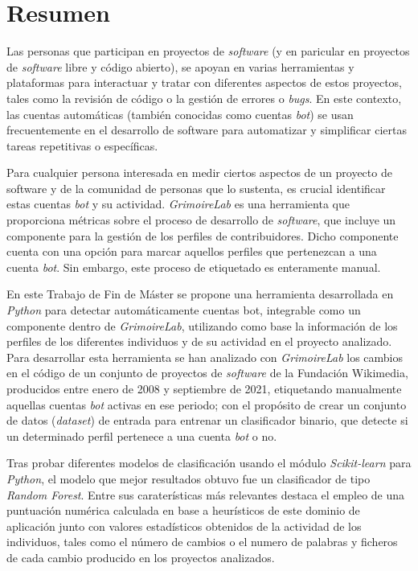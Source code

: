 \documentclass[a4paper, 12pt]{book}
\begin{document}

\chapter*{Resumen}

Las personas que participan en proyectos de \emph{software} (y en paricular en proyectos de \emph{software} libre y código abierto), se apoyan en varias herramientas y plataformas para interactuar y tratar con diferentes aspectos de estos proyectos, tales como la revisión de código o la gestión de errores o \emph{bugs}. En este contexto, las cuentas automáticas (también conocidas como cuentas \emph{bot}) se usan frecuentemente en el desarrollo de software para automatizar y simplificar ciertas tareas repetitivas o específicas.

Para cualquier persona interesada en medir ciertos aspectos de un proyecto de software y de la comunidad de personas que lo sustenta, es crucial identificar estas cuentas \emph{bot} y su actividad. \emph{GrimoireLab} es una herramienta que proporciona métricas sobre el proceso de desarrollo de \emph{software}, que incluye un componente para la gestión de los perfiles de contribuidores. Dicho componente cuenta con una opción para marcar aquellos perfiles que pertenezcan a una cuenta \emph{bot}. Sin embargo, este proceso de etiquetado es enteramente manual.

En este Trabajo de Fin de Máster se propone una herramienta desarrollada en \emph{Python} para detectar automáticamente cuentas bot, integrable como un componente dentro de \emph{GrimoireLab}, utilizando como base la información de los perfiles de los diferentes individuos y de su actividad en el proyecto analizado. Para desarrollar esta herramienta se han analizado con \emph{GrimoireLab} los cambios en el código de un conjunto de proyectos de \emph{software} de la Fundación Wikimedia, producidos entre enero de 2008 y septiembre de 2021, etiquetando manualmente aquellas cuentas \emph{bot} activas en ese periodo; con el propósito de crear un conjunto de datos (\emph{dataset}) de entrada para entrenar un clasificador binario, que detecte si un determinado perfil pertenece a una cuenta \emph{bot} o no.

Tras probar diferentes modelos de clasificación usando el módulo \emph{Scikit-learn} para \emph{Python}, el modelo que mejor resultados obtuvo fue un clasificador de tipo \emph{Random Forest}. Entre sus caraterísticas más relevantes destaca el empleo de una puntuación numérica calculada en base a heurísticos de este dominio de aplicación junto con valores estadísticos obtenidos de la actividad de los individuos, tales como el número de cambios o el numero de palabras y ficheros de cada cambio producido en los proyectos analizados.
\end{document}
